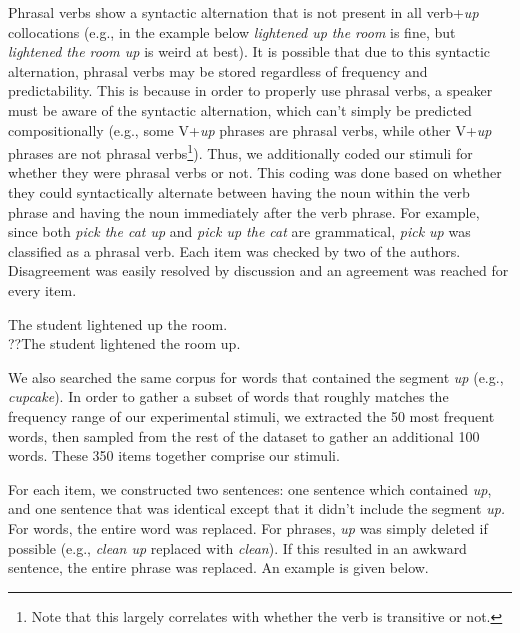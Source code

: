 \documentclass[
  12pt,
  letterpaper,
]{scrreprt}
\begin{document}
Phrasal verbs show a syntactic alternation that is not present in all
verb+\emph{up} collocations (e.g., in the example below \emph{lightened
up the room} is fine, but \emph{lightened the room up} is weird at
best). It is possible that due to this syntactic alternation, phrasal
verbs may be stored regardless of frequency and predictability. This is
because in order to properly use phrasal verbs, a speaker must be aware
of the syntactic alternation, which can't simply be predicted
compositionally (e.g., some V+\emph{up} phrases are phrasal verbs, while
other V+\emph{up} phrases are not phrasal verbs\footnote{Note that this
  largely correlates with whether the verb is transitive or not.}).
Thus, we additionally coded our stimuli for whether they were phrasal
verbs or not. This coding was done based on whether they could
syntactically alternate between having the noun within the verb phrase
and having the noun immediately after the verb phrase. For example,
since both \emph{pick the cat up} and \emph{pick up the cat} are
grammatical, \emph{pick up} was classified as a phrasal verb. Each item
was checked by two of the authors. Disagreement was easily resolved by
discussion and an agreement was reached for every item.

\begin{exe} 
\ex
  \begin{singlespace}
  \begin{xlist}
    \ex The student lightened up the room. \\
    \ex ??The student lightened the room up. \\
  \end{xlist}
  \end{singlespace}
\end{exe}

We also searched the same corpus for words that contained the segment
\emph{up} (e.g., \emph{cupcake}). In order to gather a subset of words
that roughly matches the frequency range of our experimental stimuli, we
extracted the 50 most frequent words, then sampled from the rest of the
dataset to gather an additional 100 words. These 350 items together
comprise our stimuli.

For each item, we constructed two sentences: one sentence which
contained \emph{up}, and one sentence that was identical except that it
didn't include the segment \emph{up.} For words, the entire word was
replaced. For phrases, \emph{up} was simply deleted if possible (e.g.,
\emph{clean up} replaced with \emph{clean}). If this resulted in an
awkward sentence, the entire phrase was replaced. An example is given
below.
\end{document}
